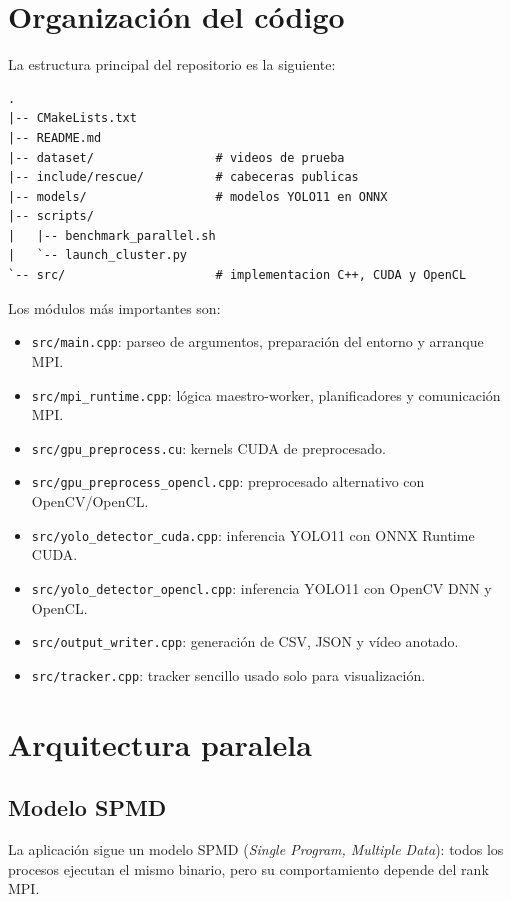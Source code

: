 \documentclass[12pt,a4paper]{article}
\begin{document}
\section{Organizaci\'on del c\'odigo}

La estructura principal del repositorio es la siguiente:

\begin{lstlisting}[style=console]
.
|-- CMakeLists.txt
|-- README.md
|-- dataset/                 # videos de prueba
|-- include/rescue/          # cabeceras publicas
|-- models/                  # modelos YOLO11 en ONNX
|-- scripts/
|   |-- benchmark_parallel.sh
|   `-- launch_cluster.py
`-- src/                     # implementacion C++, CUDA y OpenCL
\end{lstlisting}

Los m\'odulos m\'as importantes son:

\begin{itemize}
    \item \texttt{src/main.cpp}: parseo de argumentos, preparaci\'on del entorno y arranque MPI.
    \item \texttt{src/mpi\_runtime.cpp}: l\'ogica maestro-worker, planificadores y comunicaci\'on MPI.
    \item \texttt{src/gpu\_preprocess.cu}: kernels CUDA de preprocesado.
    \item \texttt{src/gpu\_preprocess\_opencl.cpp}: preprocesado alternativo con OpenCV/OpenCL.
    \item \texttt{src/yolo\_detector\_cuda.cpp}: inferencia YOLO11 con ONNX Runtime CUDA.
    \item \texttt{src/yolo\_detector\_opencl.cpp}: inferencia YOLO11 con OpenCV DNN y OpenCL.
    \item \texttt{src/output\_writer.cpp}: generaci\'on de CSV, JSON y v\'ideo anotado.
    \item \texttt{src/tracker.cpp}: tracker sencillo usado solo para visualizaci\'on.
\end{itemize}

\section{Arquitectura paralela}

\subsection{Modelo SPMD}

La aplicaci\'on sigue un modelo SPMD (\textit{Single Program, Multiple Data}): todos los
procesos ejecutan el mismo binario, pero su comportamiento depende del rank MPI.
\end{document}
